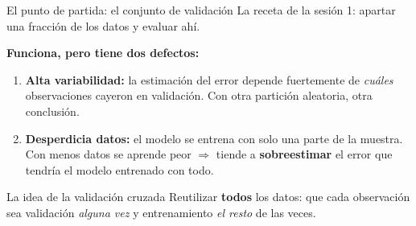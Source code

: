 \documentclass{beamer}
\newcommand{\1}{\mathbb{I}}
\begin{document}
\begin{frame}{El punto de partida: el conjunto de validación}
\small
La receta de la sesión 1: apartar una fracción de los datos y evaluar ahí.

\vspace{0.2cm}
\begin{center}
\end{center}
\pause

\textbf{Funciona, pero tiene dos defectos:}
\begin{enumerate}\itemsep5pt
  \item \textbf{Alta variabilidad:} la estimación del error depende fuertemente de \emph{cuáles} observaciones cayeron en validación. Con otra partición aleatoria, otra conclusión.
  \item \textbf{Desperdicia datos:} el modelo se entrena con solo una parte de la muestra. Con menos datos se aprende peor $\Rightarrow$ tiende a \textbf{sobreestimar} el error que tendría el modelo entrenado con todo. \pause
\end{enumerate}

\vspace{0.2cm}
\begin{block}{La idea de la validación cruzada}
Reutilizar \textbf{todos} los datos: que cada observación sea validación \emph{alguna vez} y entrenamiento \emph{el resto} de las veces.
\end{block}
\end{frame}
\end{document}
